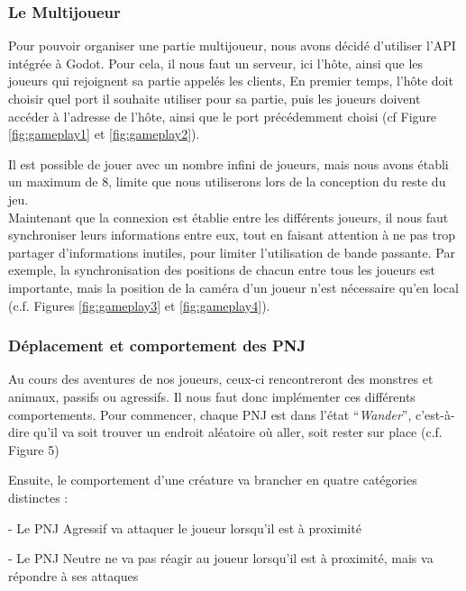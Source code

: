

\subsubsection{Le Multijoueur}

Pour pouvoir organiser une partie multijoueur, nous avons décidé d'utiliser l'API intégrée à Godot.
Pour cela, il nous faut un serveur, ici l'hôte, ainsi que les joueurs qui rejoignent sa partie appelés les clients,
En premier temps, l'hôte doit choisir quel port il souhaite utiliser pour sa partie, puis les joueurs doivent accéder à l'adresse de l'hôte, ainsi que le port précédemment choisi (cf Figure \ref{fig:gameplay1} et \ref*{fig:gameplay2}).



Il est possible de jouer avec un nombre infini de joueurs, mais nous avons établi un maximum de 8, limite que nous utiliserons lors de la conception du reste du jeu.
\\

Maintenant que la connexion est établie entre les différents joueurs, il nous faut synchroniser leurs informations entre eux, tout en faisant attention à ne pas trop partager d'informations inutiles, pour limiter l'utilisation de bande passante.
Par exemple, la synchronisation des positions de chacun entre tous les joueurs est importante, mais la position de la caméra d'un joueur n'est nécessaire qu'en local (c.f. Figures \ref*{fig:gameplay3} et \ref*{fig:gameplay4}).



\subsubsection*{Déplacement et comportement des PNJ}

Au cours des aventures de nos joueurs, ceux-ci rencontreront des monstres et animaux, passifs ou agressifs.
Il nous faut donc implémenter ces différents comportements.
Pour commencer, chaque PNJ est dans l'état “\textit{Wander}”, c'est-à-dire qu'il va soit trouver un endroit aléatoire où aller, soit rester sur place (c.f. Figure 5)

Ensuite, le comportement d'une créature va brancher en quatre catégories distinctes :

- Le PNJ Agressif va attaquer le joueur lorsqu'il est à proximité

- Le PNJ Neutre ne va pas réagir au joueur lorsqu'il est à proximité, mais va répondre à ses attaques

